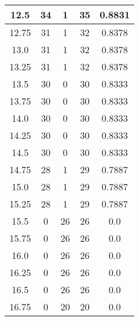 \documentclass[letterpaper, 12pt]{article}
\begin{document}
\begin{longtable}{|c|c|c|c|c|}
12.5 & 34 & 1 & 35 & 0.8831 \\
\hline
12.75 & 31 & 1 & 32 & 0.8378 \\
\hline
13.0 & 31 & 1 & 32 & 0.8378 \\
\hline
13.25 & 31 & 1 & 32 & 0.8378 \\
\hline
13.5 & 30 & 0 & 30 & 0.8333 \\
\hline
13.75 & 30 & 0 & 30 & 0.8333 \\
\hline
14.0 & 30 & 0 & 30 & 0.8333 \\
\hline
14.25 & 30 & 0 & 30 & 0.8333 \\
\hline
14.5 & 30 & 0 & 30 & 0.8333 \\
\hline
14.75 & 28 & 1 & 29 & 0.7887 \\
\hline
15.0 & 28 & 1 & 29 & 0.7887 \\
\hline
15.25 & 28 & 1 & 29 & 0.7887 \\
\hline
15.5 & 0 & 26 & 26 & 0.0 \\
\hline
15.75 & 0 & 26 & 26 & 0.0 \\
\hline
16.0 & 0 & 26 & 26 & 0.0 \\
\hline
16.25 & 0 & 26 & 26 & 0.0 \\
\hline
16.5 & 0 & 26 & 26 & 0.0 \\
\hline
16.75 & 0 & 20 & 20 & 0.0 \\
\hline
\end{longtable}
\end{document}
